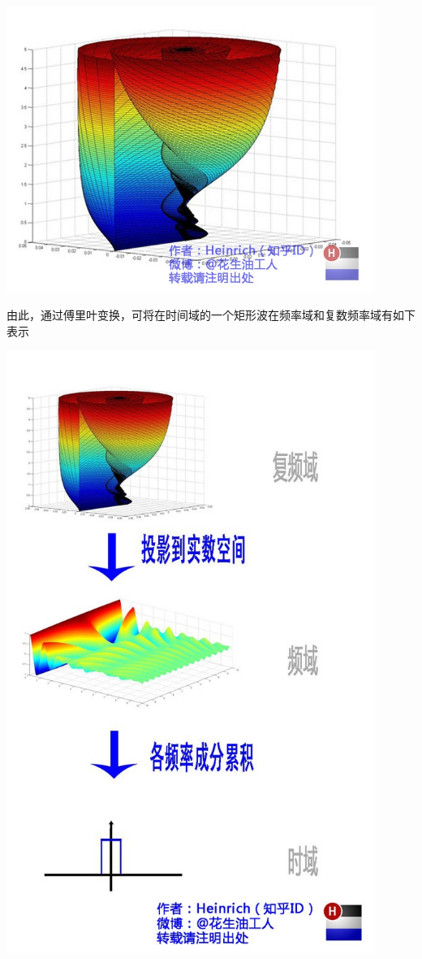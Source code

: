 \documentclass[a4paper,16pt,UTF8]{article}
\begin{document}
\includegraphics[width = 0.9\textwidth]{4.jpg}

由此，通过傅里叶变换，可将在时间域的一个矩形波在频率域和复数频率域有如下表示

\includegraphics[width = 0.9\textwidth]{6.jpg}
\end{document}
